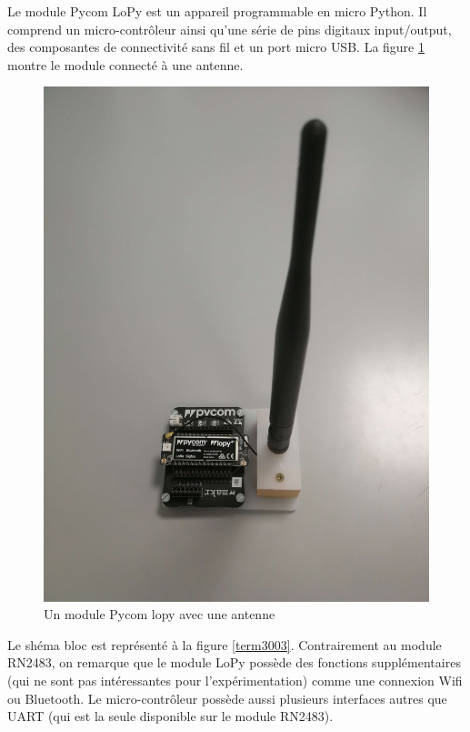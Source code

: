 Le module Pycom LoPy \footnotemark[11] est un appareil programmable en micro Python. Il comprend un micro-contrôleur ainsi qu'une série de pins digitaux input/output,  des composantes de connectivité sans fil et un port micro \ac{USB}. La figure \ref{term35} montre le module  connecté à une antenne.

\newpage

\begin{figure}[h]
\centering

\includegraphics[scale=0.08]{images/lopy.png}
\caption{Un module Pycom lopy avec une antenne}\label{term35}
\end{figure}


Le shéma bloc \footnotemark[11]  est représenté à la figure \ref{term3003}. Contrairement au module RN2483, on remarque que le module LoPy possède des fonctions supplémentaires 
(qui ne sont pas intéressantes pour l'expérimentation) comme une connexion Wifi ou Bluetooth. Le micro-contrôleur possède aussi plusieurs interfaces autres que UART (qui est la seule disponible sur le module RN2483).

